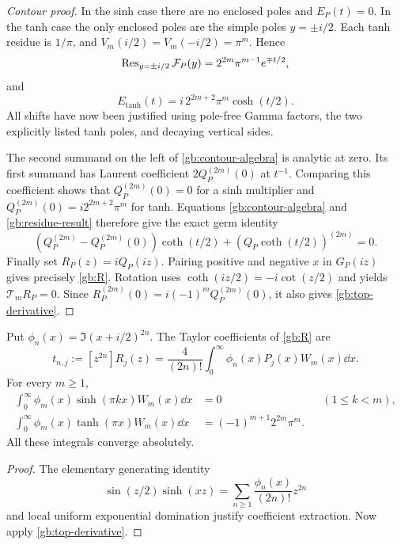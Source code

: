 \begin{proof}[Contour proof]
In the sinh case there are no enclosed poles and $E_P(t)=0$.
In the tanh case the only enclosed poles are the simple poles
$y=\pm i/2$.  Each tanh residue is $1/\pi$, and
$V_m(i/2)=V_m(-i/2)=\pi^m$.  Hence
\[
 \operatorname{Res}_{y=\pm i/2}\mathcal F_P(y)
      =2^{2m}\pi^{m-1}e^{\mp t/2},
\]
and
\begin{equation}\label{gb:residue-result}
 E_{\tanh}(t)=i\,2^{2m+2}\pi^m\cosh(t/2).
\end{equation}
All shifts have now been justified using pole-free Gamma factors,
the two explicitly listed tanh poles, and decaying vertical sides.

The second summand on the left of \eqref{gb:contour-algebra} is
analytic at zero.  Its first summand has Laurent coefficient
$2Q_P^{(2m)}(0)$ at $t^{-1}$.  Comparing this coefficient shows
that $Q_P^{(2m)}(0)=0$ for a sinh multiplier and
$Q_P^{(2m)}(0)=i2^{2m+2}\pi^m$ for tanh.  Equations
\eqref{gb:contour-algebra} and \eqref{gb:residue-result} therefore
give the exact germ identity
\[
 (Q_P^{(2m)}-Q_P^{(2m)}(0))\coth(t/2)
                  +(Q_P\coth(t/2))^{(2m)}=0.
\]
Finally set $R_P(z)=iQ_P(iz)$.  Pairing positive and negative
$x$ in $G_P(iz)$ gives precisely \eqref{gb:R}.  Rotation uses
$\coth(iz/2)=-i\cot(z/2)$ and yields
$\mathcal T_mR_P=0$.  Since
$R_P^{(2m)}(0)=i(-1)^mQ_P^{(2m)}(0)$, it also gives
\eqref{gb:top-derivative}.
\end{proof}

\begin{corollary}\label{gb:moment-identities}
Put $\phi_n(x)=\Im(x+i/2)^{2n}$.  The Taylor coefficients of
\eqref{gb:R} are
\begin{equation}\label{gb:t}
 t_{n,j}:=[z^{2n}]R_j(z)
      =\frac4{(2n)!}\int_0^\infty\phi_n(x)P_j(x)W_m(x)\dd x.
\end{equation}
For every $m\ge1$,
\begin{align}
 \int_0^\infty\phi_m(x)\sinh(\pi kx)W_m(x)\dd x&=0
                  &&(1\le k<m),\label{gb:orthogonality}\\
 \int_0^\infty\phi_m(x)\tanh(\pi x)W_m(x)\dd x
          &=(-1)^{m+1}2^{2m}\pi^m.\label{gb:evaluation}
\end{align}
All these integrals converge absolutely.
\end{corollary}

\begin{proof}
The elementary generating identity
\[
 \sin(z/2)\sinh(xz)=
       \sum_{n\ge1}\frac{\phi_n(x)}{(2n)!}z^{2n}
\]
and local uniform exponential domination justify coefficient
extraction.  Now apply \eqref{gb:top-derivative}.
\end{proof}

